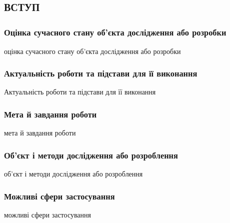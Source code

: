 \newpage
{}
\chapter*{\textsc{вступ}}

\subsection*{Оцінка сучасного стану об’єкта дослідження або розробки}
оцінка сучасного стану об’єкта дослідження або розробки
\subsection*{Актуальність роботи та підстави для її виконання}
Актуальність роботи та підстави для її виконання 
\subsection*{Мета й завдання роботи}
мета й завдання роботи
\subsection*{Об’єкт і методи дослідження або розроблення}
об’єкт і методи дослідження або розроблення
\subsection*{Можливі сфери застосування}
можливі сфери застосування

